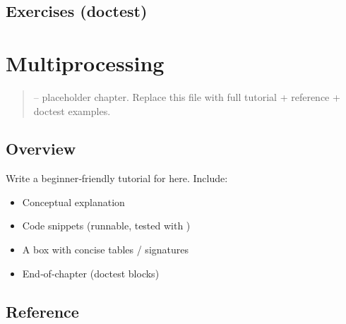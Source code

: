 \documentclass[a4paper,11pt,english]{sphinxmanual}
\begin{document}
\subsection{Exercises (doctest)}
\label{\detokenize{concurrency/advanced_asyncio:exercises-doctest}}
\begin{sphinxVerbatim}[commandchars=\\\{\}]
\end{sphinxVerbatim}

\sphinxstepscope


\section{Multiprocessing}
\label{\detokenize{concurrency/multiprocessing:multiprocessing}}\label{\detokenize{concurrency/multiprocessing::doc}}\begin{quote}

\sphinxAtStartPar
{} – placeholder chapter. Replace this file with full tutorial + reference + doctest examples.
\end{quote}


\subsection{Overview}
\label{\detokenize{concurrency/multiprocessing:overview}}
\sphinxAtStartPar
Write a beginner‑friendly tutorial for  here. Include:
\begin{itemize}
\item {} 
\sphinxAtStartPar
Conceptual explanation

\item {} 
\sphinxAtStartPar
Code snippets (runnable, tested with )

\item {} 
\sphinxAtStartPar
A  box with concise tables / signatures

\item {} 
\sphinxAtStartPar
End‑of‑chapter  (doctest blocks)

\end{itemize}


\subsection{Reference}
\label{\detokenize{concurrency/multiprocessing:reference}}
\end{document}
